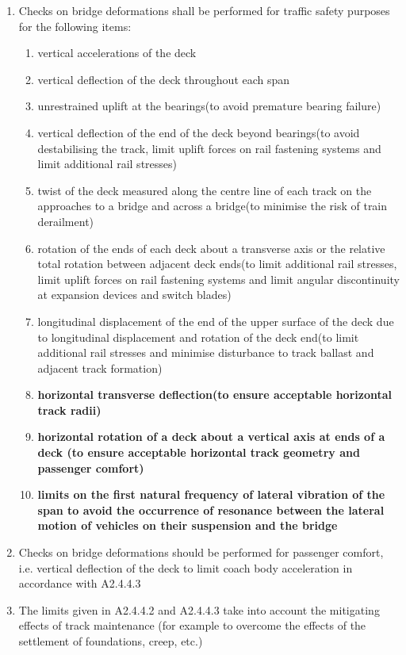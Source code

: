 \begin{enumerate}
	\item Checks on bridge deformations shall be performed for traffic safety purposes for the following items:
	\begin{enumerate}[-]
		\item vertical accelerations of the deck
		\item vertical deflection of the deck throughout each span
		\item unrestrained uplift at the bearings(to avoid premature bearing failure)
		\item vertical deflection of the end of the deck beyond bearings(to avoid destabilising the track, limit uplift forces on rail fastening systems and limit additional rail stresses) 
		\item twist of the deck measured along the centre line of each track on the approaches to a bridge and across a bridge(to minimise the risk of train derailment)
		\item rotation of the ends of each deck about a transverse axis or the relative total rotation between adjacent deck ends(to limit additional rail stresses, limit uplift forces on rail fastening systems and limit angular discontinuity at expansion devices and switch blades)
		\item longitudinal displacement of the end of the upper surface of the deck due to longitudinal displacement and rotation of the deck end(to limit additional rail stresses and minimise disturbance to track ballast and adjacent track formation)
		\item \textbf{horizontal transverse deflection(to ensure acceptable horizontal track radii)}
		\item \textbf{horizontal rotation of a deck about a vertical axis at ends of a deck (to ensure acceptable horizontal track geometry and passenger comfort)}
		\item \textbf{limits on the first natural frequency of lateral vibration of the span to avoid the occurrence of resonance between the lateral motion of vehicles on their suspension and the bridge}
	\end{enumerate}
	\item Checks on bridge deformations should be performed for passenger comfort, i.e. vertical deflection of the deck to limit coach body acceleration in accordance with A2.4.4.3\citet{EC0}
	\item The limits given in A2.4.4.2 and A2.4.4.3\citet{EC0} take into account the mitigating effects of track maintenance (for example to overcome the effects of the settlement of foundations, creep, etc.) 
\end{enumerate}


